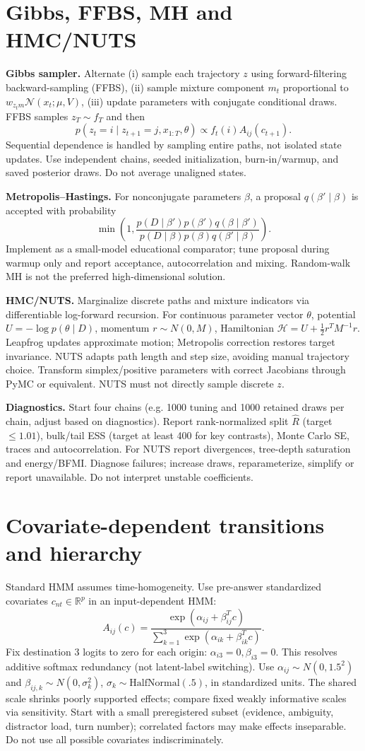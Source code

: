 \documentclass[11pt,letterpaper]{article}
\newcommand{\R}{\mathbb R}
\newcommand{\sectionpage}[1]{\clearpage\section{#1}}
\begin{document}
\sectionpage{Gibbs, FFBS, MH and HMC/NUTS}
\textbf{Gibbs sampler.} Alternate (i) sample each trajectory $z$ using forward-filtering backward-sampling (FFBS), (ii) sample mixture component $m_t$ proportional to $w_{z_tm}\mathcal N(x_t;\mu,V)$, (iii) update parameters with conjugate conditional draws. FFBS samples $z_T\sim f_T$ and then
\[
p(z_t=i\mid z_{t+1}=j,x_{1:T},\theta)\propto f_t(i)A_{ij}(c_{t+1}).
\]
Sequential dependence is handled by sampling entire paths, not isolated state updates. Use independent chains, seeded initialization, burn-in/warmup, and saved posterior draws. Do not average unaligned states.

\textbf{Metropolis--Hastings.} For nonconjugate parameters $\beta$, a proposal $q(\beta'\mid\beta)$ is accepted with probability
\[
\min\left(1,\frac{p(D\mid\beta')p(\beta')q(\beta\mid\beta')}{p(D\mid\beta)p(\beta)q(\beta'\mid\beta)}\right).
\]
Implement as a small-model educational comparator; tune proposal during warmup only and report acceptance, autocorrelation and mixing. Random-walk MH is not the preferred high-dimensional solution.

\textbf{HMC/NUTS.} Marginalize discrete paths and mixture indicators via differentiable log-forward recursion. For continuous parameter vector $\theta$, potential $U=-\log p(\theta\mid D)$, momentum $r\sim N(0,M)$, Hamiltonian $\mathcal H=U+\frac12r^TM^{-1}r$. Leapfrog updates approximate motion; Metropolis correction restores target invariance. NUTS adapts path length and step size, avoiding manual trajectory choice. Transform simplex/positive parameters with correct Jacobians through PyMC or equivalent. NUTS must not directly sample discrete $z$.

\textbf{Diagnostics.} Start four chains (e.g. 1000 tuning and 1000 retained draws per chain, adjust based on diagnostics). Report rank-normalized split $\widehat R$ (target $\le1.01$), bulk/tail ESS (target at least 400 for key contrasts), Monte Carlo SE, traces and autocorrelation. For NUTS report divergences, tree-depth saturation and energy/BFMI. Diagnose failures; increase draws, reparameterize, simplify or report unavailable. Do not interpret unstable coefficients.

\sectionpage{Covariate-dependent transitions and hierarchy}
Standard HMM assumes time-homogeneity. Use pre-answer standardized covariates $c_{nt}\in\R^p$ in an input-dependent HMM:
\[
A_{ij}(c)=\frac{\exp(\alpha_{ij}+\beta_{ij}^Tc)}{\sum_{k=1}^3\exp(\alpha_{ik}+\beta_{ik}^Tc)}.
\]
Fix destination 3 logits to zero for each origin: $\alpha_{i3}=0,\beta_{i3}=0$. This resolves additive softmax redundancy (not latent-label switching). Use $\alpha_{ij}\sim N(0,1.5^2)$ and $\beta_{ij,k}\sim N(0,\sigma_k^2)$, $\sigma_k\sim\mathrm{HalfNormal}(.5)$, in standardized units. The shared scale shrinks poorly supported effects; compare fixed weakly informative scales via sensitivity. Start with a small preregistered subset (evidence, ambiguity, distractor load, turn number); correlated factors may make effects inseparable. Do not use all possible covariates indiscriminately.
\end{document}
